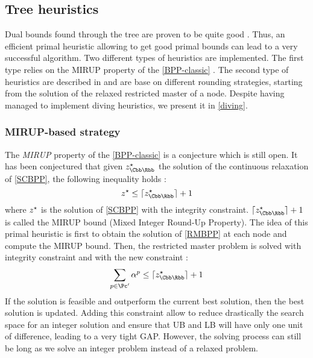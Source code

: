\subsection{Tree heuristics}
\label{heuristic-tree}

Dual bounds found through the tree are proven to be quite good \cite{sadykov2013bin}. Thus, an efficient primal heuristic allowing to get good primal bounds can lead to a very successful algorithm. Two different types of heuristics are implemented. The first type relies on the MIRUP property of the \eqref{BPP-classic} \cite{delorme2016bin}. The second type of heuristics are described in \cite{wascher1996heuristics} and are base on different rounding strategies, starting from the solution of the relaxed restricted master of a node. Despite having managed to implement diving heuristics, we present it in \ref{diving}. 

\subsubsection{MIRUP-based strategy}

The \textit{MIRUP} property of the \eqref{BPP-classic} is a conjecture which is still open. It has been conjectured \cite{scheithauer1995modified} that given $\opt{z}_{\Cbb\Rbb}$ the solution of the continuous relaxation of \eqref{SCBPP}, the following inequality holds :
\begin{equation}
	\label{mirup}
	\opt{z} \leq \ceil{\opt{z}_{\Cbb\Rbb}} + 1
\end{equation}
where ${z}^{\star}$ is the solution of \eqref{SCBPP} with the integrity constraint. $\ceil{\opt{z}_{\Cbb\Rbb}} + 1$ is called the MIRUP bound (Mixed Integer Round-Up Property). The idea of this primal heuristic is first to obtain the solution of \eqref{RMBPP} at each node and compute the MIRUP bound. Then, the restricted master problem is solved with integrity constraint and with the new constraint :
\begin{equation*}
	\sum_{p \in \Pc'} \alpha^p \leq \ceil{\opt{z}_{\Cbb\Rbb}} + 1
\end{equation*}
If the solution is feasible and outperform the current best solution, then the best solution is updated. Adding this constraint allow to reduce drastically the search space for an integer solution and ensure that UB and LB will have only one unit of difference, leading to a very tight GAP. However, the solving process can still be long as we solve an integer problem instead of a relaxed problem.


